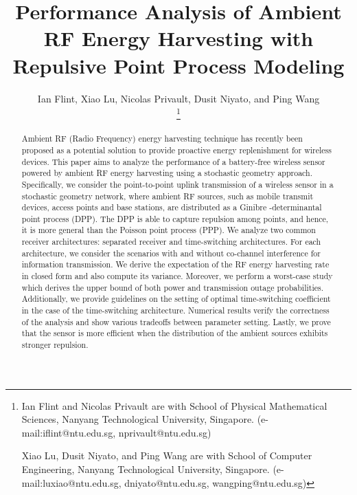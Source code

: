 \documentclass[12pt,draftclsnofoot,onecolumn]{IEEEtran}
\begin{document}
 
\title{Performance Analysis of Ambient RF Energy Harvesting with Repulsive Point Process Modeling} 

\author{Ian Flint, Xiao Lu, Nicolas Privault, Dusit Niyato, and Ping Wang	\\
\thanks{Ian Flint and Nicolas Privault are with School of Physical  Mathematical Sciences, Nanyang Technological University, Singapore. (e-mail:iflint@ntu.edu.sg, nprivault@ntu.edu.sg) 
    
Xiao Lu, Dusit Niyato, and Ping Wang are with School of Computer Engineering, Nanyang Technological University, Singapore. (e-mail:luxiao@ntu.edu.sg, dniyato@ntu.edu.sg, wangping@ntu.edu.sg)}
} 
 



\maketitle

\vspace{-20mm}

\begin{abstract}
Ambient RF (Radio Frequency) energy harvesting technique has recently been proposed as a potential solution to provide proactive energy replenishment for wireless devices. This paper aims to analyze the performance of a battery-free wireless sensor powered by ambient RF energy harvesting using a stochastic geometry approach. Specifically, we consider the point-to-point uplink transmission of a wireless sensor in a stochastic geometry network, where ambient RF sources, such as mobile transmit devices, access points and base stations, are distributed as a Ginibre -determinantal point process (DPP). The DPP is able to capture repulsion among points, and hence, it is more general than the Poisson point process (PPP). We analyze two common receiver architectures: separated receiver and time-switching architectures. For each architecture, we consider the scenarios with and without co-channel interference for information transmission. We derive the expectation of the RF energy harvesting rate in closed form and also compute its variance. Moreover, we perform a worst-case study which derives the upper bound of both power and transmission outage probabilities. Additionally, we provide guidelines on the setting of optimal time-switching coefficient in the case of the time-switching architecture. Numerical results verify the correctness of the analysis and show  various tradeoffs between parameter setting. Lastly, we prove that the sensor is more efficient when the distribution of the ambient sources exhibits stronger repulsion. 

\end{abstract}
\end{document}
